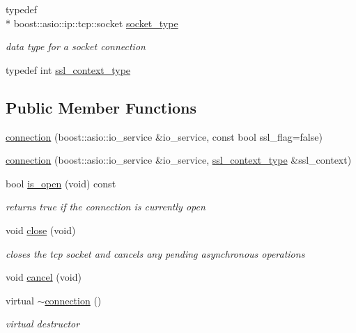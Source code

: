\begin{DoxyCompactItemize}
typedef \\*
boost\-::asio\-::ip\-::tcp\-::socket \hyperlink{classpion_1_1tcp_1_1connection_a353c4d500505d51924d165c28b04641c}{socket\-\_\-type}
\begin{DoxyCompactList}\small\item\em data type for a socket connection \end{DoxyCompactList}\item 
typedef int \hyperlink{classpion_1_1tcp_1_1connection_a8587c35bbf48a119aa82f228e779a30e}{ssl\-\_\-context\-\_\-type}
\end{DoxyCompactItemize}
\subsection*{Public Member Functions}
\begin{DoxyCompactItemize}
\item 
\hyperlink{classpion_1_1tcp_1_1connection_a0b2f63b845ee0f7bba3c94c5fb7f567c}{connection} (boost\-::asio\-::io\-\_\-service \&io\-\_\-service, const bool ssl\-\_\-flag=false)
\item 
\hyperlink{classpion_1_1tcp_1_1connection_a33326975c04036c79e2481d6e3541c7e}{connection} (boost\-::asio\-::io\-\_\-service \&io\-\_\-service, \hyperlink{classpion_1_1tcp_1_1connection_a8587c35bbf48a119aa82f228e779a30e}{ssl\-\_\-context\-\_\-type} \&ssl\-\_\-context)
\item 
bool \hyperlink{classpion_1_1tcp_1_1connection_aa454ce0733cbd9bc97d4fe22f2eb8218}{is\-\_\-open} (void) const 
\begin{DoxyCompactList}\small\item\em returns true if the connection is currently open \end{DoxyCompactList}\item 
void \hyperlink{classpion_1_1tcp_1_1connection_a8b52fce50e8987a982c46bc82b463075}{close} (void)
\begin{DoxyCompactList}\small\item\em closes the tcp socket and cancels any pending asynchronous operations \end{DoxyCompactList}\item 
void \hyperlink{classpion_1_1tcp_1_1connection_ae0172c7e218f12a0b396a4e0e42e4de2}{cancel} (void)
\item 
virtual \hyperlink{classpion_1_1tcp_1_1connection_a4fbf93efbbb9f67dbe882c33ce3964da}{$\sim$connection} ()
\begin{DoxyCompactList}\small\item\em virtual destructor \end{DoxyCompactList}\item 

\end{DoxyCompactItemize}
